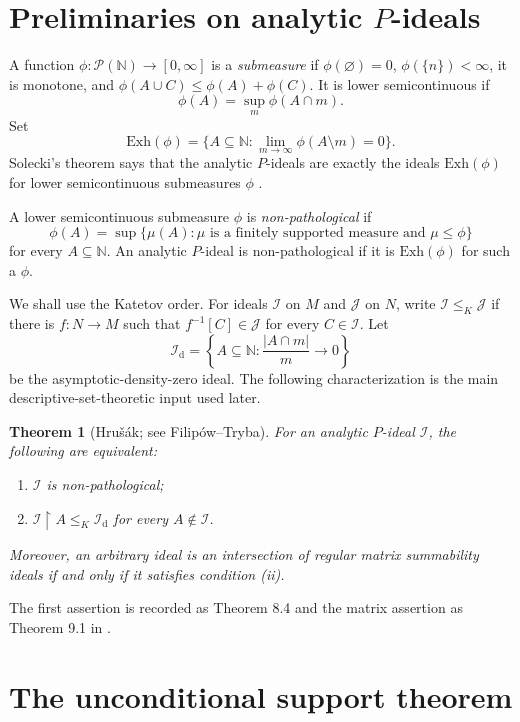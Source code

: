 \documentclass[11pt]{article}
\newtheorem{theorem}{Theorem}[section]
\theoremstyle{definition}
\theoremstyle{remark}
\newcommand{\N}{\mathbb N}
\newcommand{\cP}{\mathcal P}
\newcommand{\I}{\mathcal I}
\newcommand{\J}{\mathcal J}
\newcommand{\Exh}{\mathrm{Exh}}
\newcommand{\Id}{\mathcal I_{\mathrm d}}
\newcommand{\restr}{\mathbin{\upharpoonright}}
\begin{document}
\section{Preliminaries on analytic $P$-ideals}

A function $\phi:\cP(\N)\to[0,\infty]$ is a \emph{submeasure} if
$\phi(\varnothing)=0$, $\phi(\{n\})<\infty$, it is monotone, and
$\phi(A\cup C)\leq\phi(A)+\phi(C)$.  It is lower semicontinuous if
\[
 \phi(A)=\sup_m\phi(A\cap m).
\]
Set
\[
 \Exh(\phi)=
 \{A\subseteq\N:\lim_{m\to\infty}\phi(A\setminus m)=0\}.
\]
Solecki's theorem says that the analytic $P$-ideals are exactly the ideals
$\Exh(\phi)$ for lower semicontinuous submeasures $\phi$ \cite{Solecki}.

A lower semicontinuous submeasure $\phi$ is \emph{non-pathological} if
\begin{equation}\label{eq:nonpath-submeasure}
 \phi(A)=\sup\{\mu(A):\mu\text{ is a finitely supported measure and }
                         \mu\leq\phi\}
\end{equation}
for every $A\subseteq\N$.  An analytic $P$-ideal is non-pathological if it is
$\Exh(\phi)$ for such a $\phi$.

We shall use the Katetov order.  For ideals $\I$ on $M$ and $\J$ on $N$, write
$\I\leq_K\J$ if there is $f:N\to M$ such that $f^{-1}[C]\in\J$ for every
$C\in\I$.  Let
\[
 \Id=\left\{A\subseteq\N:\frac{|A\cap m|}{m}\longrightarrow0\right\}
\]
be the asymptotic-density-zero ideal.  The following characterization is the
main descriptive-set-theoretic input used later.

\begin{theorem}[Hru\v{s}\'ak; see Filip\'ow--Tryba]\label{thm:hrusak}
For an analytic $P$-ideal $\I$, the following are equivalent:
\begin{enumerate}[label=(\roman*)]
 \item $\I$ is non-pathological;
 \item $\I\restr A\leq_K\Id$ for every $A\notin\I$.
\end{enumerate}
Moreover, an arbitrary ideal is an intersection of regular matrix summability
ideals if and only if it satisfies condition \emph{(ii)}.
\end{theorem}

The first assertion is recorded as Theorem 8.4 and the matrix assertion as
Theorem 9.1 in \cite{FilipowTryba}.

\section{The unconditional support theorem}
\end{document}
